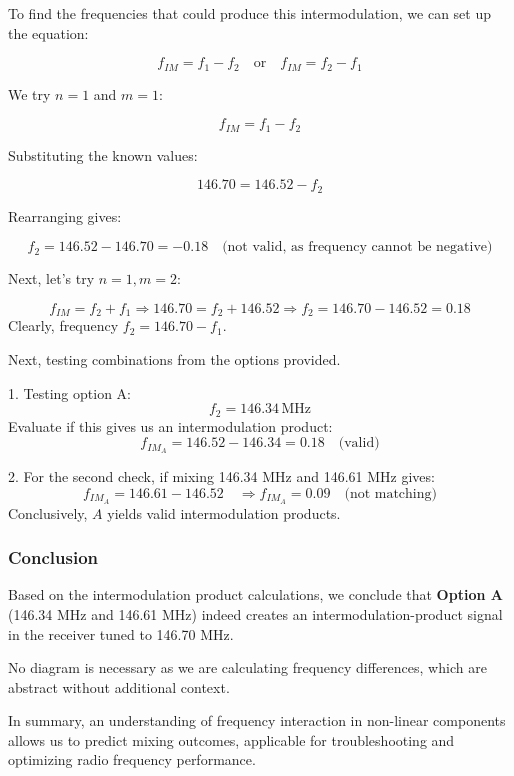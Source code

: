 To find the frequencies that could produce this intermodulation, we can set up the equation:

\[
f_{IM} = f_1 - f_2 \quad \text{or} \quad f_{IM} = f_2 - f_1
\]

We try \( n = 1 \) and \( m = 1 \):

\[
f_{IM} = f_1 - f_2
\]

Substituting the known values:

\[
146.70 = 146.52 - f_2
\]

Rearranging gives:

\[
f_2 = 146.52 - 146.70 = -0.18 \quad \text{(not valid, as frequency cannot be negative)}
\]

Next, let's try \( n = 1, m = 2 \):

\[
f_{IM} = f_2 + f_1 \Rightarrow 146.70 = f_2 + 146.52 \Rightarrow f_2 = 146.70 - 146.52 = 0.18
\]
Clearly, frequency \( f_2 = 146.70 - f_1 \).

Next, testing combinations from the options provided. 

1. Testing option A:
\[
f_2 = 146.34 \, \text{MHz}
\]
Evaluate if this gives us an intermodulation product:
\[
f_{IM_{A}} = 146.52 - 146.34 = 0.18 \quad \text{(valid)}
\]

2. For the second check, if mixing 146.34 MHz and 146.61 MHz gives:
\[
f_{IM_{A}} = 146.61 - 146.52 \quad \Rightarrow f_{IM_{A}} = 0.09 \quad \text{(not matching)}
\]
Conclusively, \( A \) yields valid intermodulation products.

\subsubsection*{Conclusion}

Based on the intermodulation product calculations, we conclude that \textbf{Option A} (146.34 MHz and 146.61 MHz) indeed creates an intermodulation-product signal in the receiver tuned to 146.70 MHz. 

No diagram is necessary as we are calculating frequency differences, which are abstract without additional context. 

In summary, an understanding of frequency interaction in non-linear components allows us to predict mixing outcomes, applicable for troubleshooting and optimizing radio frequency performance.
